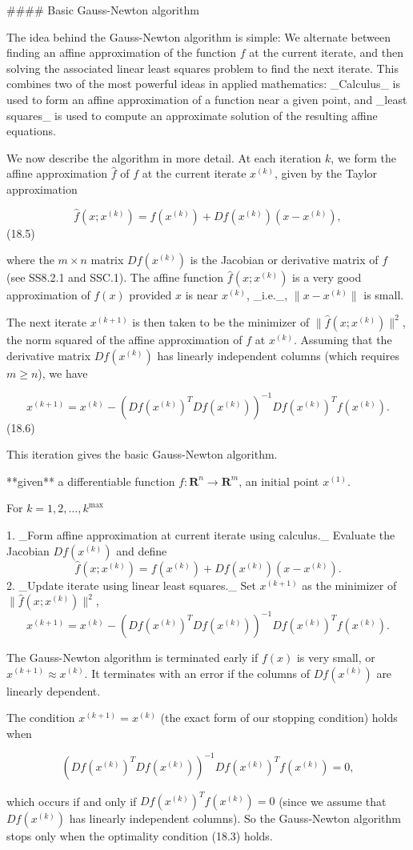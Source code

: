 

#### Basic Gauss-Newton algorithm

The idea behind the Gauss-Newton algorithm is simple: We alternate between finding an affine approximation of the function \(f\) at the current iterate, and then solving the associated linear least squares problem to find the next iterate. This combines two of the most powerful ideas in applied mathematics: _Calculus_ is used to form an affine approximation of a function near a given point, and _least squares_ is used to compute an approximate solution of the resulting affine equations.

We now describe the algorithm in more detail. At each iteration \(k\), we form the affine approximation \(\hat{f}\) of \(f\) at the current iterate \(x^{(k)}\), given by the Taylor approximation

\[\hat{f}(x;x^{(k)})=f(x^{(k)})+Df(x^{(k)})(x-x^{(k)}),\] (18.5)

where the \(m\times n\) matrix \(Df(x^{(k)})\) is the Jacobian or derivative matrix of \(f\) (see SS8.2.1 and SSC.1). The affine function \(\hat{f}(x;x^{(k)})\) is a very good approximation of \(f(x)\) provided \(x\) is near \(x^{(k)}\), _i.e._, \(\|x-x^{(k)}\|\) is small.

The next iterate \(x^{(k+1)}\) is then taken to be the minimizer of \(\|\hat{f}(x;x^{(k)})\|^{2}\), the norm squared of the affine approximation of \(f\) at \(x^{(k)}\). Assuming that the derivative matrix \(Df(x^{(k)})\) has linearly independent columns (which requires \(m\geq n\)), we have

\[x^{(k+1)}=x^{(k)}-\left(Df(x^{(k)})^{T}Df(x^{(k)})\right)^{-1}Df(x^{(k)})^{T} f(x^{(k)}).\] (18.6)

This iteration gives the basic Gauss-Newton algorithm.

**given** a differentiable function \(f:\mathbf{R}^{n}\to\mathbf{R}^{m}\), an initial point \(x^{(1)}\).

For \(k=1,2,\ldots,k^{\max}\)

1. _Form affine approximation at current iterate using calculus._ Evaluate the Jacobian \(Df(x^{(k)})\) and define \[\hat{f}(x;x^{(k)})=f(x^{(k)})+Df(x^{(k)})(x-x^{(k)}).\]
2. _Update iterate using linear least squares._ Set \(x^{(k+1)}\) as the minimizer of \(\|\hat{f}(x;x^{(k)})\|^{2}\), \[x^{(k+1)}=x^{(k)}-\left(Df(x^{(k)})^{T}Df(x^{(k)})\right)^{-1}Df(x^{(k)})^{T} f(x^{(k)}).\]

The Gauss-Newton algorithm is terminated early if \(f(x)\) is very small, or \(x^{(k+1)}\approx x^{(k)}\). It terminates with an error if the columns of \(Df(x^{(k)})\) are linearly dependent.

The condition \(x^{(k+1)}=x^{(k)}\) (the exact form of our stopping condition) holds when

\[\left(Df(x^{(k)})^{T}Df(x^{(k)})\right)^{-1}Df(x^{(k)})^{T}f(x^{(k)})=0,\]

which occurs if and only if \(Df(x^{(k)})^{T}f(x^{(k)})=0\) (since we assume that \(Df(x^{(k)})\) has linearly independent columns). So the Gauss-Newton algorithm stops only when the optimality condition (18.3) holds.

